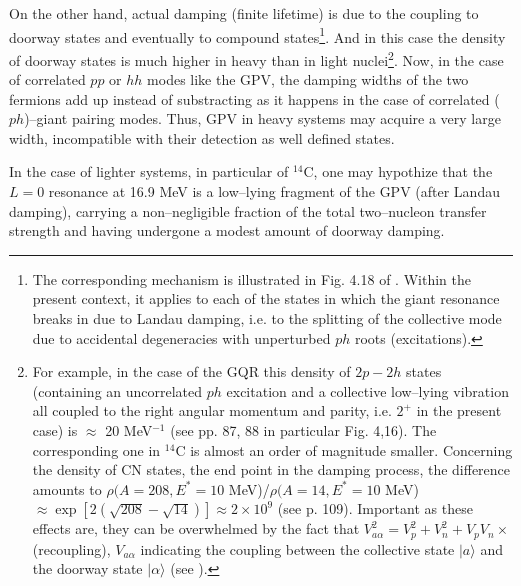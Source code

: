 \documentclass[a4paper,11pt]{article}
\numberwithin{equation}{section}
\numberwithin{figure}{section}
\numberwithin{table}{section}
\newcommand{\ket}[1]{|{#1} \rangle }
\begin{document}
On the other hand, actual damping (finite lifetime) is due to the coupling to doorway states and eventually to compound states\footnote{The corresponding mechanism is illustrated in Fig. 4.18 of \cite{Bortignon:98}. Within the present context, it applies to each of the states in which the giant resonance breaks in due to Landau damping, i.e. to the splitting of the collective mode due to accidental degeneracies with unperturbed $ph$ roots (excitations).}. And in this case the density of doorway states is much higher in heavy than in light nuclei\footnote{For example, in the case of the GQR this density of $2p-2h$ states (containing an uncorrelated $ph$ excitation and a collective low--lying vibration all coupled to the right angular momentum and parity, i.e. $2^+$ in the present case) is $\approx$ 20 MeV$^{-1}$ (see \cite{Bortignon:98} pp. 87, 88 in particular Fig. 4,16). The corresponding one in $^{14}$C is almost an order of magnitude smaller. Concerning the density of CN states, the end point in the damping process, the difference amounts to $\rho (A=208, E^*=10 $ MeV)/$\rho(A=14, E^*=10$ MeV)$\approx \exp[2(\sqrt{208}-\sqrt{14})]\approx 2\times 10^9$ (see \cite{Bortignon:98} p. 109). Important as these effects are, they can be overwhelmed by the fact that $V^2_{a\alpha}=V^2_p+V^2_n+V_pV_n\times$ (recoupling), $V_{a\alpha}$ indicating the coupling between the collective state $\ket{a}$ and the doorway state $\ket{\alpha}$ (see \cite{Bortignon:98}).}. Now, in the case of correlated $pp$ or $hh$ modes like the GPV, the damping widths of the two fermions add up instead of substracting as it happens in the case of correlated ($ph$)--giant pairing modes. Thus, GPV in heavy systems may acquire a very large width, incompatible with their detection as well defined states.


In the case of lighter systems, in particular of $^{14}$C, one may hypothize that the $L=0$ resonance at 16.9 MeV is a low--lying fragment of the GPV (after Landau damping), carrying a non--negligible fraction of the total two--nucleon transfer strength and having undergone a modest amount of doorway damping.
\end{document}
